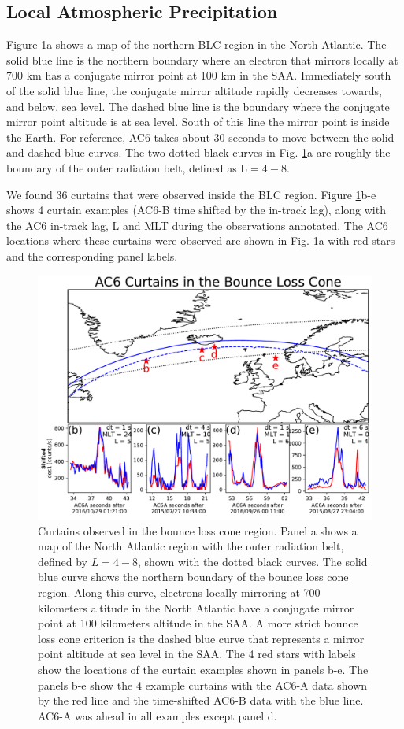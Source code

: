 \documentclass[draft]{agujournal2019}
\begin{document}
\subsection{Local Atmospheric Precipitation}
Figure \ref{fig3}a shows a map of the northern BLC region in the North Atlantic. The solid blue line is the northern boundary where an electron that mirrors locally at 700 km has a conjugate mirror point at 100 km in the SAA. Immediately south of the solid blue line, the conjugate mirror altitude rapidly decreases towards, and below, sea level. The dashed blue line is the boundary where the conjugate mirror point altitude is at sea level. South of this line the mirror point is inside the Earth. For reference, AC6 takes about 30 seconds to move between the solid and dashed blue curves. The two dotted black curves in Fig. \ref{fig3}a are roughly the boundary of the outer radiation belt, defined as $\mathrm{L}=4-8$.

We found 36 curtains that were observed inside the BLC region. Figure \ref{fig3}b-e shows 4 curtain examples (AC6-B time shifted by the in-track lag), along with the AC6 in-track lag, L and MLT during the observations annotated. The AC6 locations where these curtains were observed are shown in Fig. \ref{fig3}a with red stars and the corresponding panel labels.

\begin{figure}
\includegraphics[width=\textwidth]{fig3.pdf}
\caption{Curtains observed in the bounce loss cone region. Panel a shows a map of the North Atlantic region with the outer radiation belt, defined by $L=4-8$, shown with the dotted black curves. The solid blue curve shows the northern boundary of the bounce loss cone region. Along this curve, electrons locally mirroring at 700 kilometers altitude in the North Atlantic have a conjugate mirror point at 100 kilometers altitude in the SAA. A more strict bounce loss cone criterion is the dashed blue curve that represents a mirror point altitude at sea level in the SAA. The 4 red stars with labels show the locations of the curtain examples shown in panels b-e. The panels b-e show the 4 example curtains with the AC6-A data shown by the red line and the time-shifted AC6-B data with the blue line. AC6-A was ahead in all examples except panel d.}
\label{fig3}
\end{figure}
\end{document}
